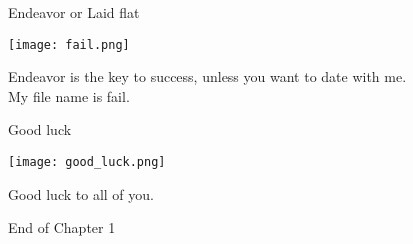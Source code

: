\documentclass{beamer}
\begin{document}
\begin{frame}{Endeavor or Laid flat}
\begin{center}
\texttt{[image: fail.png]}
\end{center}
\begin{center}
Endeavor is the key to success, unless you want to date with me. \\
My file name is fail.
\end{center}
\end{frame}
\begin{frame}{Good luck}
\begin{center}
\texttt{[image: good\_luck.png]}
\end{center}
\begin{center}
Good luck to all of you.
\end{center}
\end{frame}
\begin{frame}{}
\begin{center}
\Large{End of Chapter 1}
\end{center}
\end{frame}
\end{document}
